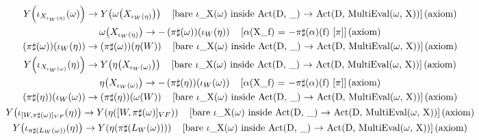\documentclass[11pt]{article}
\begin{document}
{\begin{gather*}
Y\!\left(\iota_{X_{\iota_W(\eta)}}\!\left(\omega\right)\right) \to Y\!\left(\omega\!\left(X_{\iota_W(\eta)}\right)\right) \quad \text{[bare \ensuremath{\iota}\_X(\ensuremath{\omega}) inside Act(D, \_) \ensuremath{\to} Act(D, MultiEval(\ensuremath{\omega}, X))]\,(axiom)} \\
\omega\!\left(X_{\iota_W(\eta)}\right) \to -\left(\pi\sharp\!\left(\omega\right)\right)\!\left(\iota_W\!\left(\eta\right)\right) \quad \text{[\ensuremath{\alpha}(X\_f) = \ensuremath{-}\ensuremath{\pi}\ensuremath{\sharp}(\ensuremath{\alpha})(f) [\ensuremath{\pi}]]\,(axiom)} \\
\left(\pi\sharp\!\left(\omega\right)\right)\!\left(\iota_W\!\left(\eta\right)\right) \to \left(\pi\sharp\!\left(\omega\right)\right)\!\left(\eta\!\left(W\right)\right) \quad \text{[bare \ensuremath{\iota}\_X(\ensuremath{\omega}) inside Act(D, \_) \ensuremath{\to} Act(D, MultiEval(\ensuremath{\omega}, X))]\,(axiom)} \\
Y\!\left(\iota_{X_{\iota_W(\omega)}}\!\left(\eta\right)\right) \to Y\!\left(\eta\!\left(X_{\iota_W(\omega)}\right)\right) \quad \text{[bare \ensuremath{\iota}\_X(\ensuremath{\omega}) inside Act(D, \_) \ensuremath{\to} Act(D, MultiEval(\ensuremath{\omega}, X))]\,(axiom)} \\
\eta\!\left(X_{\iota_W(\omega)}\right) \to -\left(\pi\sharp\!\left(\eta\right)\right)\!\left(\iota_W\!\left(\omega\right)\right) \quad \text{[\ensuremath{\alpha}(X\_f) = \ensuremath{-}\ensuremath{\pi}\ensuremath{\sharp}(\ensuremath{\alpha})(f) [\ensuremath{\pi}]]\,(axiom)} \\
\left(\pi\sharp\!\left(\eta\right)\right)\!\left(\iota_W\!\left(\omega\right)\right) \to \left(\pi\sharp\!\left(\eta\right)\right)\!\left(\omega\!\left(W\right)\right) \quad \text{[bare \ensuremath{\iota}\_X(\ensuremath{\omega}) inside Act(D, \_) \ensuremath{\to} Act(D, MultiEval(\ensuremath{\omega}, X))]\,(axiom)} \\
Y\!\left(\iota_{[W,\pi\sharp(\omega)]_{VF}}\!\left(\eta\right)\right) \to Y\!\left(\eta\!\left([W,\pi\sharp(\omega)]_{VF}\right)\right) \quad \text{[bare \ensuremath{\iota}\_X(\ensuremath{\omega}) inside Act(D, \_) \ensuremath{\to} Act(D, MultiEval(\ensuremath{\omega}, X))]\,(axiom)} \\
Y\!\left(\iota_{\pi\sharp(L_W(\omega))}\!\left(\eta\right)\right) \to Y\!\left(\eta\!\left(\pi\sharp\!\left(L_W\!\left(\omega\right)\right)\right)\right) \quad \text{[bare \ensuremath{\iota}\_X(\ensuremath{\omega}) inside Act(D, \_) \ensuremath{\to} Act(D, MultiEval(\ensuremath{\omega}, X))]\,(axiom)} \\

\end{gather*}}
\end{document}
